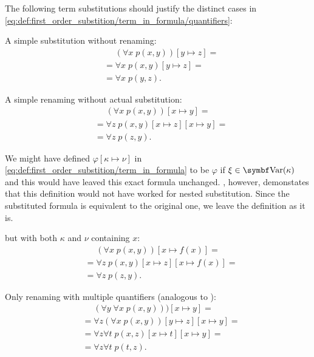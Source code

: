 \begin{example}\label{ex:first_order_substition}
  The following term substitutions should justify the distinct cases in \eqref{eq:def:first_order_substition/term_in_formula/quantifiers}:
  \begin{ExEnum}
     A simple substitution without renaming:
    \begin{align*}
      &\phantom{{}={}}
      (\forall x\; p(x, y))[y \mapsto z]
      = \\ &=
      \forall x\; p(x, y)[y \mapsto z]
      = \\ &=
      \forall x\; p(y, z).
    \end{align*}

     A simple renaming without actual substitution:
    \begin{align*}
      &\phantom{{}={}}
      (\forall x\; p(x, y))[x \mapsto y]
      = \\ &=
      \forall z\; p(x, y)[x \mapsto z][x \mapsto y]
      = \\ &=
      \forall z\; p(z, y).
    \end{align*}

    We might have defined \( \varphi[\kappa \mapsto \nu] \) in \eqref{eq:def:first_order_substition/term_in_formula} to be \( \varphi \) if \( \xi \in \Bold{Var}(\kappa) \) and this would have leaved this exact formula unchanged. , however, demonstates that this definition would not have worked for nested substitution. Since the substituted formula is equivalent to the original one, we leave the definition as it is.

      but with both \( \kappa \) and \( \nu \) containing \( x \):
    \begin{align*}
      &\phantom{{}={}}
      (\forall x\; p(x, y))[x \mapsto f(x)]
      = \\ &=
      \forall z\; p(x, y)[x \mapsto z][x \mapsto f(x)]
      = \\ &=
      \forall z\; p(z, y).
    \end{align*}

     Only renaming with multiple quantifiers (analogous to ):
    \begin{align*}
      &\phantom{{}={}}
      (\forall y\; \forall x\; p(x, y)))[x \mapsto y]
      = \\ &=
      \forall z (\forall x\; p(x, y))[y \mapsto z][x \mapsto y]
      = \\ &=
      \forall z \forall t\; p(x, z)[x \mapsto t][x \mapsto y]
      = \\ &=
      \forall z \forall t\; p(t, z).
    \end{align*}


\end{ExEnum}
\end{example}
